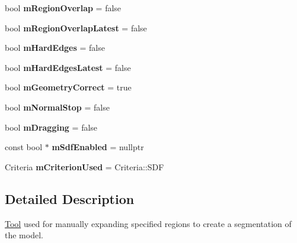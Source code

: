 \begin{DoxyCompactItemize}
bool {\bfseries m\+Region\+Overlap} = false
\item 
\mbox{\label{classpepr3d_1_1_semiautomatic_segmentation_a891511ae4a879017f2b41f7ea60ea00d}} 
bool {\bfseries m\+Region\+Overlap\+Latest} = false
\item 
\mbox{\label{classpepr3d_1_1_semiautomatic_segmentation_a36fe1e14da326441541dae71813efcbd}} 
bool {\bfseries m\+Hard\+Edges} = false
\item 
\mbox{\label{classpepr3d_1_1_semiautomatic_segmentation_a6a66c343b795f12b6e0ce2da9348a114}} 
bool {\bfseries m\+Hard\+Edges\+Latest} = false
\item 
\mbox{\label{classpepr3d_1_1_semiautomatic_segmentation_a66acd079f9745d4256ab565875a16467}} 
bool {\bfseries m\+Geometry\+Correct} = true
\item 
\mbox{\label{classpepr3d_1_1_semiautomatic_segmentation_a9241c976815c903667d695474f800ed7}} 
bool {\bfseries m\+Normal\+Stop} = false
\item 
\mbox{\label{classpepr3d_1_1_semiautomatic_segmentation_aaf38b8e2bd48df516e2dc85bc96255d8}} 
bool {\bfseries m\+Dragging} = false
\item 
\mbox{\label{classpepr3d_1_1_semiautomatic_segmentation_a54b1b6bd1dc72e3e2c8705fc40d8bd24}} 
const bool $\ast$ {\bfseries m\+Sdf\+Enabled} = nullptr
\item 
\mbox{\label{classpepr3d_1_1_semiautomatic_segmentation_aa313797e5f5f5650463d9c5423a5f8a6}} 
Criteria {\bfseries m\+Criterion\+Used} = Criteria\+::\+S\+DF
\end{DoxyCompactItemize}


\subsection{Detailed Description}
\mbox{\hyperlink{classpepr3d_1_1_tool}{Tool}} used for manually expanding specified regions to create a segmentation of the model. 

